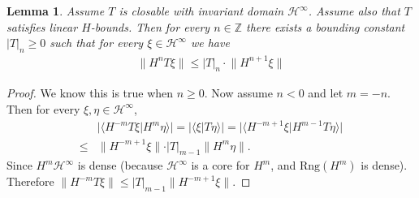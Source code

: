 \documentclass[12pt,b5paper,notitlepage]{article}
\theoremstyle{definition}
\theoremstyle{plain}
\newtheorem{lm}[df]{Lemma}
\newcommand{\mc}{\mathcal}
\newcommand{\ovl}{\overline}
\newcommand{\Dom}{\scr{D}}
\newcommand{\bk}[1]{\langle {#1}\rangle}
\newcommand{\scr}{\mathscr}
\newcommand{\Nbb}{\mathbb N}
\newcommand{\Zbb}{\mathbb Z}
\newcommand{\Rng}{\mathrm{Rng}}
\numberwithin{equation}{section}
\begin{document}
\begin{comment}
\begin{lm}
Choose $n\in\Nbb$. Assume \eqref{eqa7} holds for all $\xi\in\mc H^\infty$. Then
\begin{align*}
\Dom(H^{n+r})\subset\Dom(\ovl T)\qquad	 \ovl T\Dom(H^{n+r})\subset \Dom(H^n)
\end{align*}
and \eqref{eqa7} holds for all $\xi\in\Dom(H^{n+r})$ if $T$ is replaced by $\ovl T$.
\end{lm}


\begin{proof}
Let $\xi\in\Dom(H^{n+r})\subset\Dom(H^r)$. Choose $\xi_k=\chi_{(-k,k)}(H)\xi$, which is in $\mc H^\infty$. Since $H^r\xi_k$ converges to $H^r\xi$, by \eqref{eqa7} (where $n=0$), $T\xi_k$ is a Cauchy sequence. So, since $\xi_k\rightarrow \xi$, we conclude $\xi\in\Dom(\ovl T)$ and $T\xi_k\rightarrow\ovl T\xi$. 

Similarly, since $H^{n+r}\xi_k\rightarrow H^{n+r}\xi$, by \eqref{eqa7}, we conclude that $H^nT\xi_k$ converges to a vector whose norm is bounded by $|T|_n\lVert H^{n+r}\xi\lVert$. Thus, because $T\xi_k\rightarrow \ovl T\xi$, we have $\ovl T\xi\in\Dom(H^n)$ and $H^n\ovl T\xi$ has norm bounded by $|T|_n\lVert H^{n+r}\xi\lVert$.
\end{proof}
\end{comment}



\begin{lm}\label{lba7}
Assume $T$ is closable with invariant  domain $\mc H^\infty$. Assume also that $T$ satisfies linear $H$-bounds. Then for every $n\in\Zbb$ there exists a bounding constant $|T|_n\geq 0$ such that for every $\xi\in\mc H^\infty$ we have
\begin{align*}
\lVert H^nT\xi\lVert\leq |T|_n\cdot \lVert H^{n+1}\xi\lVert	
\end{align*}
\end{lm}

\begin{proof}
We know this is true when $n\geq 0$. Now assume $n<0$ and let $m=-n$. Then for every $\xi,\eta\in\mc H^\infty$,
\begin{align*}
&\big|\bk{H^{-m}T\xi|H^m\eta} \big|=\big|\bk{\xi|T\eta} \big|	=\big|\bk{H^{-m+1}\xi|H^{m-1}T\eta}  \big|\\
\leq&	\lVert H^{-m+1}\xi\lVert\cdot |T|_{m-1}\lVert H^m\eta\lVert.	
\end{align*}
Since $H^m\mc H^\infty$ is dense (because $\mc H^\infty$ is a core for $H^m$, and $\Rng(H^m)$ is dense). Therefore $\lVert H^{-m}T\xi\lVert\leq |T|_{m-1}\lVert H^{-m+1}\xi\lVert$. 
\end{proof}
\end{document}
